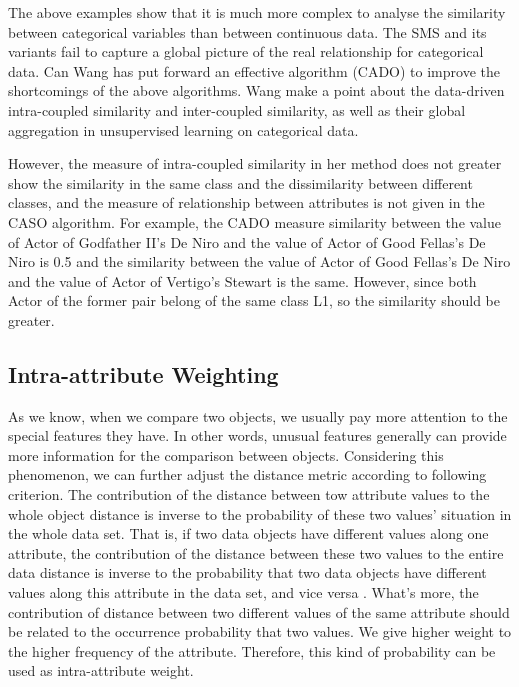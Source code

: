 \documentclass[review]{elsarticle}
\begin{document}
The above examples show that it is much more complex to analyse the similarity between categorical variables than between continuous data. The SMS and its variants fail to capture a global picture of the real relationship for categorical data. Can Wang has put forward an effective algorithm \cite{WangC2015CADO} (CADO) to improve the shortcomings of the above algorithms. Wang make a point about the data-driven intra-coupled similarity and inter-coupled similarity, as well as their global aggregation in unsupervised learning on categorical data.

However, the measure of intra-coupled similarity in her method does not greater show the similarity in the same class and the dissimilarity between different classes, and the measure of relationship between attributes is not given in the CASO algorithm. For example, the CADO measure similarity between the value of Actor of Godfather II's De Niro and the value of Actor of Good Fellas's De Niro is 0.5 and the similarity between the value of Actor of Good Fellas's De Niro and the value of Actor of Vertigo's Stewart is the same. However, since both Actor of the former pair belong of the same class L1, so the similarity should be greater.

\subsection{Intra-attribute Weighting}
As we know, when we compare two objects, we usually pay more attention to the special features they have. In other words, unusual features generally can provide more information for the comparison between objects. Considering this phenomenon, we can further adjust the distance metric according to following criterion. The contribution of the distance between tow attribute values to the whole object distance is inverse to the probability of these two values' situation in the whole data set. That is, if two data objects have different values along one attribute, the contribution of the distance between these two values to the entire data distance is inverse to the probability that two data objects have different values along this attribute in the data set, and vice versa \cite{JiaH2016NewMetric}. What's more, the contribution of distance between two different values of the same attribute should be related to the occurrence probability that two values. We give higher weight to the higher frequency of the attribute. Therefore, this kind of probability can be used as intra-attribute weight.
\end{document}
